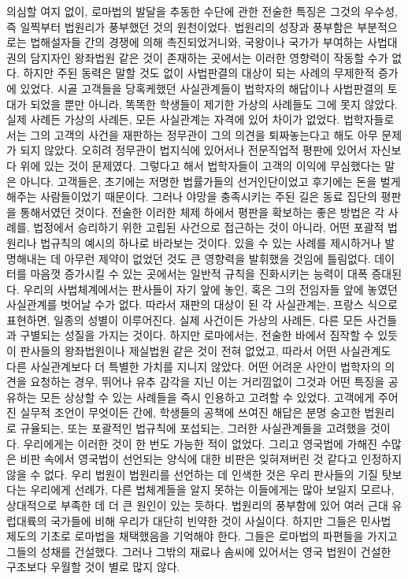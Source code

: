 의심할 여지 없이,
로마법의 발달을 추동한 수단에 관한 전술한 특징은
그것의 우수성, 즉 일찍부터 법원리가 풍부했던 것의 원천이었다.
법원리의 성장과 풍부함은 부분적으로는 법해설자들 간의 경쟁에 의해
촉진되었거니와, 국왕이나 국가가 부여하는 사법대권의 담지자인
왕좌법원 같은 것이 존재하는 곳에서는 이러한 영향력이 작동할 수가 없다.
하지만 주된 동력은 말할 것도 없이 사법판결의 대상이 되는 사례의
무제한적 증가에 있었다.
시골 고객들을 당혹케했던 사실관계들이 법학자의 해답이나 사법판결의
토대가 되었을 뿐만 아니라, 똑똑한 학생들이 제기한 가상의 사례들도
그에 못지 않았다.
실제 사례든 가상의 사례든, 모든 사실관계는 자격에 있어 차이가 없었다.
법학자들로서는 그의 고객의 사건을 재판하는 정무관이 그의 의견을
퇴짜놓는다고 해도 아무 문제가 되지 않았다.
오히려 정무관이 법지식에 있어서나 전문직업적 평판에 있어서 자신보다
위에 있는 것이 문제였다.
그렇다고 해서 법학자들이 고객의 이익에 무심했다는 말은 아니다.
고객들은, 초기에는 저명한 법률가들의 선거인단이었고
후기에는 돈을 벌게 해주는 사람들이었기 때문이다.
그러나 야망을 충족시키는 주된 길은 동료 집단의 평판을 통해서였던 것이다.
전술한 이러한 체제 하에서 평판을 확보하는 좋은 방법은 각 사례를,
법정에서 승리하기 위한 고립된 사건으로 접근하는 것이 아니라,
어떤 포괄적 법원리나 법규칙의 예시의 하나로 바라보는 것이다.
있을 수 있는 사례를 제시하거나 발명해내는 데 아무런 제약이 없었던 것도
큰 영향력을 발휘했을 것임에 틀림없다.
데이터를 마음껏 증가시킬 수 있는 곳에서는
일반적 규칙을 진화시키는 능력이 대폭 증대된다.
우리의 사법체계에서는 판사들이 자기 앞에 놓인,
혹은 그의 전임자들 앞에 놓였던 사실관계를 벗어날 수가 없다.
따라서 재판의 대상이 된 각 사실관계는,
프랑스 식으로 표현하면, 일종의 성별이 이루어진다.
실제 사건이든 가상의 사례든, 다른 모든 사건들과 구별되는 성질을 가지는 것이다.
하지만 로마에서는, 전술한 바에서 짐작할 수 있듯이
판사들의
왕좌법원이나 제실법원
같은 것이 전혀 없었고,
따라서 어떤 사실관계도 다른 사실관계보다 더 특별한 가치를 지니지 않았다.
어떤 어려운 사안이 법학자의 의견을 요청하는 경우,
뛰어나 유추 감각을 지닌 이는 거리낌없이 그것과 어떤 특징을 공유하는
모든 상상할 수 있는 사례들을 즉시 인용하고 고려할 수 있었다.
고객에게 주어진 실무적 조언이 무엇이든 간에,
학생들의 공책에 쓰여진 해답은 분명
숭고한 법원리로 규율되는, 또는 포괄적인 법규칙에 포섭되는,
그러한 사실관계들을 고려했을 것이다.
우리에게는 이러한 것이 한 번도 가능한 적이 없었다.
그리고 영국법에 가해진 수많은 비판 속에서
영국법이 선언되는 양식에 대한 비판은 잊혀져버린 것 같다고 인정하지 않을 수 없다.
우리 법원이 법원리를 선언하는 데 인색한 것은
우리 판사들의 기질 탓보다는
우리에게 선례가,
다른 법체계들을 알지 못하는 이들에게는 많아 보일지 모르나,
상대적으로 부족한 데 더 큰 원인이 있는 듯하다.
법원리의 풍부함에 있어 여러 근대 유럽대륙의 국가들에 비해
우리가 대단히 빈약한 것이 사실이다.
하지만 그들은 민사법 제도의 기초로 로마법을 채택했음을 기억해야 한다.
그들은 로마법의 파편들을 가지고 그들의 성채를 건설했다.
그러나 그밖의 재료나 솜씨에 있어서는 영국 법원이 건설한 구조보다
우월할 것이 별로 많지 않다.

